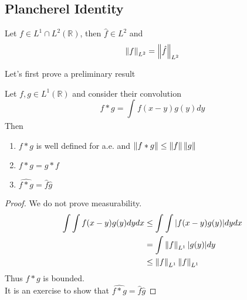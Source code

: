 \documentclass[../main.tex]{subfiles}
\begin{document}
\subsection{Plancherel Identity}

\begin{thm}[Plancherel]
Let $f \in L^{1}\cap L^{2}( \mathbb{R}) $, then $ \hat{f}\in L^{2}$ and		
\[ 
\left\lVert f\right\rVert_{L^{2}} = \left\lVert \hat{f}\right\rVert_{L^{2}} 
\]

\end{thm}
Let's first prove a preliminary result
\begin{propo}
Let $f,g \in L^{1}( \mathbb{R}) $ and consider their convolution
\[ 
f\ast g = \int_{  }^{  } f( x-y) g( y) dy
\]
Then
\begin{enumerate}
\item $f\ast g $ is well defined for a.e. and $ \left\lVert f\ast g \right\rVert \leq  \left\lVert f\right\rVert \left\lVert g\right\rVert $ 
\item $f\ast g = g\ast f$ 
\item $ \hat{f \ast  g}= \hat{f } \hat{g}$ 
\end{enumerate}
\begin{proof}
We do not prove measurability.\\
\begin{align*}
	\int \int f( x-y) g( y) dy dx &\leq  \int_{  }^{  } \int |f( x-y) g( y) | dy dx\\
				      &= \int \left\lVert f\right\rVert_{L^{1}} |g( y)| dy \\
				      & \leq \left\lVert f\right\rVert_{L^{1}} \left\lVert f \right\rVert_{L^{1}} 
\end{align*}
Thus $f\ast g $ is bounded.\\
It is an exercise to show that $ \hat{f\ast g }= \hat{f}\hat{g}$ 
\end{proof}


\end{propo}
\end{document}
